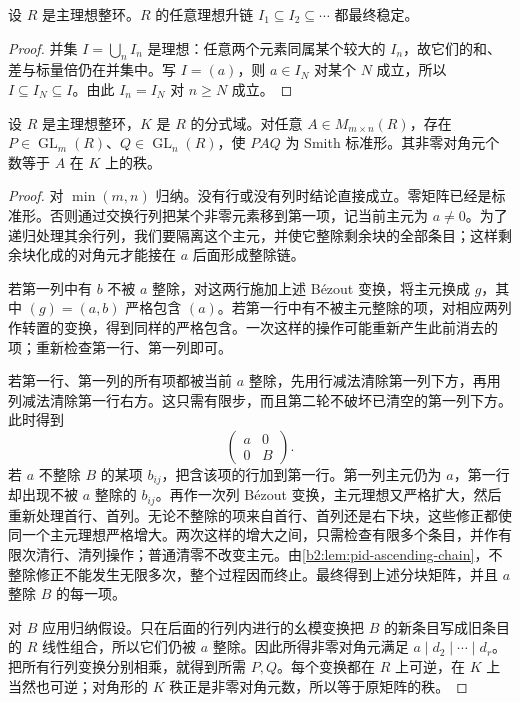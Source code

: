 \begin{lemma}\label{b2:lem:pid-ascending-chain}
	设 \(R\) 是主理想整环。\(R\) 的任意理想升链 \(I_1\subseteq I_2\subseteq\cdots\) 都最终稳定。
\end{lemma}
\begin{proof}
	并集 \(I=\bigcup_n I_n\) 是理想：任意两个元素同属某个较大的 \(I_n\)，故它们的和、差与标量倍仍在并集中。写 \(I=(a)\)，则 \(a\in I_N\) 对某个 \(N\) 成立，所以 \(I\subseteq I_N\subseteq I\)。由此 \(I_n=I_N\) 对 \(n\ge N\) 成立。
\end{proof}

\begin{theorem}\label{b2:thm:smith-normal-form}
	设 \(R\) 是主理想整环，\(K\) 是 \(R\) 的分式域。对任意 \(A\in M_{m\times n}(R)\)，存在 \(P\in\operatorname{GL}_m(R)\)、\(Q\in\operatorname{GL}_n(R)\)，使 \(PAQ\) 为 Smith 标准形。其非零对角元个数等于 \(A\) 在 \(K\) 上的秩。
\end{theorem}
\begin{proof}
	对 \(\min(m,n)\) 归纳。没有行或没有列时结论直接成立。零矩阵已经是标准形。否则通过交换行列把某个非零元素移到第一项，记当前主元为 \(a\ne0\)。为了递归处理其余行列，我们要隔离这个主元，并使它整除剩余块的全部条目；这样剩余块化成的对角元才能接在 \(a\) 后面形成整除链。

	若第一列中有 \(b\) 不被 \(a\) 整除，对这两行施加上述 Bézout 变换，将主元换成 \(g\)，其中 \((g)=(a,b)\) 严格包含 \((a)\)。若第一行中有不被主元整除的项，对相应两列作转置的变换，得到同样的严格包含。一次这样的操作可能重新产生此前消去的项；重新检查第一行、第一列即可。

	若第一行、第一列的所有项都被当前 \(a\) 整除，先用行减法清除第一列下方，再用列减法清除第一行右方。这只需有限步，而且第二轮不破坏已清空的第一列下方。此时得到
	\[
		\begin{pmatrix}a&0\\0&B\end{pmatrix}.
	\]
	若 \(a\) 不整除 \(B\) 的某项 \(b_{ij}\)，把含该项的行加到第一行。第一列主元仍为 \(a\)，第一行却出现不被 \(a\) 整除的 \(b_{ij}\)。再作一次列 Bézout 变换，主元理想又严格扩大，然后重新处理首行、首列。无论不整除的项来自首行、首列还是右下块，这些修正都使同一个主元理想严格增大。两次这样的增大之间，只需检查有限多个条目，并作有限次清行、清列操作；普通清零不改变主元。由\cref{b2:lem:pid-ascending-chain}，不整除修正不能发生无限多次，整个过程因而终止。最终得到上述分块矩阵，并且 \(a\) 整除 \(B\) 的每一项。

	对 \(B\) 应用归纳假设。只在后面的行列内进行的幺模变换把 \(B\) 的新条目写成旧条目的 \(R\) 线性组合，所以它们仍被 \(a\) 整除。因此所得非零对角元满足 \(a\mid d_2\mid\cdots\mid d_r\)。把所有行列变换分别相乘，就得到所需 \(P,Q\)。每个变换都在 \(R\) 上可逆，在 \(K\) 上当然也可逆；对角形的 \(K\) 秩正是非零对角元数，所以等于原矩阵的秩。
\end{proof}

